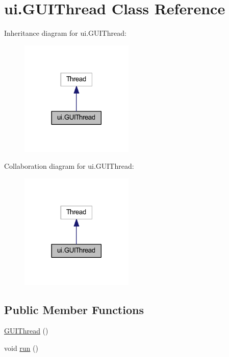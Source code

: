 \hypertarget{classui_1_1_g_u_i_thread}{}\section{ui.\+G\+U\+I\+Thread Class Reference}
\label{classui_1_1_g_u_i_thread}


Inheritance diagram for ui.\+G\+U\+I\+Thread\+:
\nopagebreak
\begin{figure}[H]
\begin{center}
\leavevmode
\includegraphics[width=153pt]{classui_1_1_g_u_i_thread__inherit__graph}
\end{center}
\end{figure}


Collaboration diagram for ui.\+G\+U\+I\+Thread\+:
\nopagebreak
\begin{figure}[H]
\begin{center}
\leavevmode
\includegraphics[width=153pt]{classui_1_1_g_u_i_thread__coll__graph}
\end{center}
\end{figure}
\subsection*{Public Member Functions}
\begin{DoxyCompactItemize}
\item 
\mbox{\hyperlink{classui_1_1_g_u_i_thread_a5d4ae813e8a2dff1330af0c2c7dc3ca1}{G\+U\+I\+Thread}} ()
\item 
void \mbox{\hyperlink{classui_1_1_g_u_i_thread_a5e9e3c77bbddb0b00ba03b87939f0ee2}{run}} ()
\end{DoxyCompactItemize}


